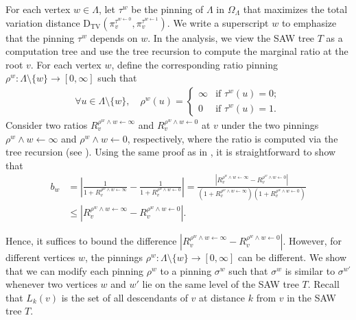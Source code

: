 \documentclass[11pt]{amsart}
\def\-#1{\mathrm{#1}}
\newcommand{\abs}[1]{\ensuremath{\left\vert#1\right\vert}}
\newcommand{\DTV}[2]{\-D_{\mathrm{TV}}\left({#1},{#2}\right)}
\theoremstyle{definition}
\theoremstyle{remark}
\begin{document}
For each vertex $w \in \Lambda$, let $\tau^w$ be the pinning of $\Lambda$ in $\Omega_{\Lambda}$ that maximizes the total variation distance $\DTV{\pi^{\tau^{w \gets 0}}_v}{\pi^{\tau^{w \gets 1}}_v}$. We write a superscript $w$ to emphasize that the pinning $\tau^w$ depends on $w$. 
In the analysis, we view the SAW tree $T$ as a computation tree and use the tree recursion to compute the marginal ratio at the root $v$. For each vertex $w$, define the corresponding ratio pinning $\rho^w: \Lambda \setminus \{w\} \to [0,\infty]$ such that 
\begin{align}\label{eq:rho-w}
\forall u \in \Lambda \setminus \{w\}, \quad \rho^w(u)=\begin{cases}
\infty & \text{if } \tau^w(u) = 0;\\
0 & \text{if } \tau^w(u) = 1.
\end{cases}
\end{align}
Consider two ratios $R_v^{\rho^w \land w \gets \infty}$ and $R_v^{\rho^w \land w \gets 0}$ at $v$ under the two pinnings $\rho^w \land w \gets \infty$ and $\rho^w \land w \gets 0$, respectively, where the ratio is computed via the tree recursion (see ). Using the same proof as in , it is straightforward to show that
\begin{align*}
b_w &= \left | \frac{1}{1+R_v^{\rho^w \land w \gets \infty}} - \frac{1}{1+R_v^{\rho^w \land w \gets 0}} \right | = \frac{\abs{R_v^{\rho^w \land w \gets \infty}-R_v^{\rho^w \land w \gets 0}}}{(1+R_v^{\rho^w \land w \gets \infty})(1+R_v^{\rho^w \land w \gets 0})} \\
&\leq \abs{R_v^{\rho^w \land w \gets \infty}-R_v^{\rho^w \land w \gets 0}}.
\end{align*}

Hence, it suffices to bound the difference $\abs{R_v^{\rho^w \land w \gets \infty}-R_v^{\rho^w \land w \gets 0}}$.
However, for different vertices $w$, the pinnings $\rho^w: \Lambda \setminus \{w\} \to [0,\infty]$ can be different. We show that we can modify each pinning $\rho^w$ to a pinning $\sigma^w$ such that $\sigma^w$ is similar to $\sigma^{w'}$ whenever two vertices $w$ and $w'$ lie on the same level of the SAW tree $T$. Recall that $L_k(v)$ is the set of all descendants of $v$ at distance $k$ from $v$ in the SAW tree $T$. %
\end{document}
